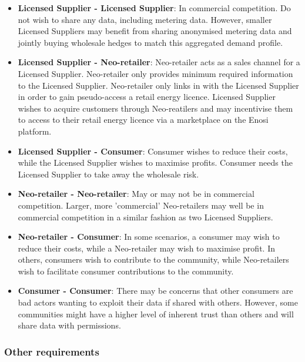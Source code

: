 \documentclass{article}
\theoremstyle{definition}
\theoremstyle{plain} %
\begin{document}
\begin{itemize}

\item{ \textbf{Licensed Supplier - Licensed Supplier}:
In commercial competition. Do not wish to share any data, including metering data. However, smaller Licensed Suppliers may benefit from sharing anonymised metering data and jointly buying wholesale hedges to match this aggregated demand profile.}

\item{ \textbf{Licensed Supplier - Neo-retailer}:
Neo-retailer acts as a sales channel for a Licensed Supplier. Neo-retailer only provides minimum required information to the Licensed Supplier. Neo-retailer only links in with the Licensed Supplier in order to gain pseudo-access a retail energy licence. Licensed Supplier wishes to acquire customers through Neo-reatilers and may incentivise them to access to their retail energy licence via a marketplace on the Enosi platform.}

\item{ \textbf{Licensed Supplier - Consumer}:
Consumer wishes to reduce their costs, while the Licensed Supplier wishes to maximise profits. Consumer needs the Licensed Supplier to take away the wholesale risk.}

\item{ \textbf{Neo-retailer - Neo-retailer}:
May or may not be in commercial competition. Larger, more 'commercial' Neo-retailers may well be in commercial competition in a similar fashion as two Licensed Suppliers.}

\item{ \textbf{Neo-retailer - Consumer}:
In some scenarios, a consumer may wish to reduce their costs, while a Neo-retailer may wish to maximise profit. In others, consumers wish to contribute to the community, while Neo-retailers wish to facilitate consumer contributions to the community.}

\item{ \textbf{Consumer - Consumer}:
There may be concerns that other consumers are bad actors wanting to exploit their data if shared with others. However, some communities might have a higher level of inherent trust than others and will share data with permissions.}

\end{itemize}

\subsubsection{Other requirements}
\end{document}
